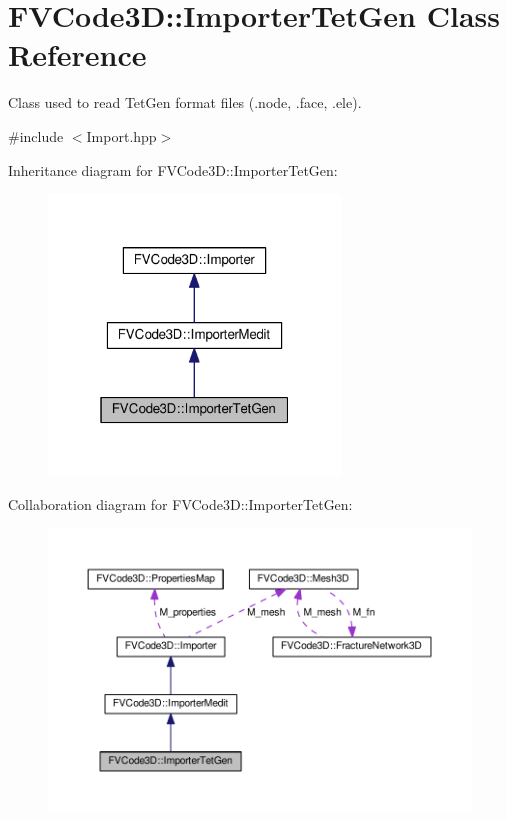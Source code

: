\hypertarget{classFVCode3D_1_1ImporterTetGen}{}\section{F\+V\+Code3D\+:\+:Importer\+Tet\+Gen Class Reference}
\label{classFVCode3D_1_1ImporterTetGen}


Class used to read Tet\+Gen format files (.node, .face, .ele).  




{\ttfamily \#include $<$Import.\+hpp$>$}



Inheritance diagram for F\+V\+Code3D\+:\+:Importer\+Tet\+Gen\+:
\nopagebreak
\begin{figure}[H]
\begin{center}
\leavevmode
\includegraphics[width=220pt]{classFVCode3D_1_1ImporterTetGen__inherit__graph}
\end{center}
\end{figure}


Collaboration diagram for F\+V\+Code3D\+:\+:Importer\+Tet\+Gen\+:
\nopagebreak
\begin{figure}[H]
\begin{center}
\leavevmode
\includegraphics[width=350pt]{classFVCode3D_1_1ImporterTetGen__coll__graph}
\end{center}
\end{figure}
